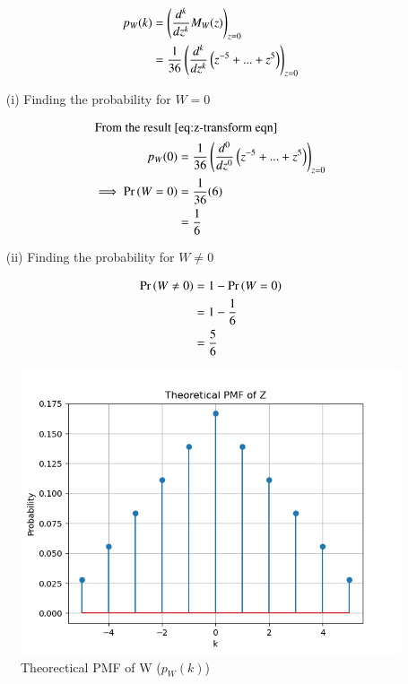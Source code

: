 \documentclass[journal,12pt,twocolumn]{IEEEtran}
\theoremstyle{remark}
\begin{document}
\begin{align}
	p_W(k) &= \left(\frac{d^k}{dz^k}M_W(z)\right)_{z=0}\\
	&= \frac{1}{36}\left(\frac{d^k}{dz^k}\left(z^{-5}+...+z^{5}\right)\right)_{z=0} \label{eq:z-transform eqn}
\end{align}
\begin{enumerate}
\item[(i)] Finding the probability for $W = 0$
\end{enumerate}
\begin{align}
	\intertext{From the result $\eqref{eq:z-transform eqn}$}
	p_W(0) &= \frac{1}{36}\left(\frac{d^0}{dz^0}\left(z^{-5}+...+z^{5}\right)\right)_{z=0}\\
	\implies \Pr\left(W=0\right) &= \frac{1}{36}(6)\\
	&= \frac{1}{6}
\end{align}
\begin{enumerate}
\item[(ii)] Finding the probability for $W \neq 0$
\end{enumerate}
\begin{align}
	\Pr\left(W \neq 0\right) &= 1-\Pr\left(W=0\right)\\
	&= 1-\frac{1}{6}\\
	&= \frac{5}{6}
\end{align}
\newpage
\begin{figure}
\includegraphics[width=\columnwidth]{./figs/main_act.png}
\caption{Theorectical PMF of W ($p_W(k)$)}
\label{fig:theo_pmf(W)}
\end{figure}
\end{document}
